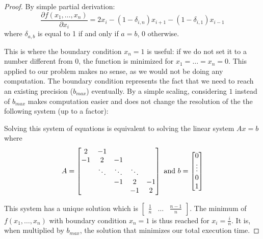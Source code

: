\begin{proof}
    By simple partial derivation: \[ \frac{\partial f(x_1,\dots,x_n)}{\partial
    x_i} = 2x_i - (1-\delta_{i,n})x_{i+1} - (1-\delta_{i,1})x_{i-1} \] where
    $\delta_{a,b} $ is equal to 1 if and only if $a=b$, 0 otherwise.

    This is where the boundary condition $x_n = 1$ is useful: if we do not set it
    to a number different from 0, the function is minimized for
    $x_1=\dots=x_n=0$. This applied to our problem makes no sense, as we
    would not be doing any computation. The boundary condition represents the
    fact that we need to reach an existing precision ($b_{max}$) eventually. By
    a simple scaling, considering $1$ instead of $b_{max}$ makes computation
    easier and does not change the resolution of the the following system (up
    to a factor):


    Solving this system of equations is equivalent to solving the linear system $Ax=b$ where
    \[ A =
    \begin{bmatrix}
    2       & -1 &  &  &  \\
    -1       & 2 & -1 &  &  \\
    & \ddots & \ddots & \ddots & \\
    & & -1 & 2 & -1 \\
           &  &  & -1 & 2
    \end{bmatrix}
    \textup{ and } b = \begin{bmatrix} 0 \\ \vdots \\ 0 \\ 1 \end{bmatrix} \]

    This system has a unique solution which is $\begin{bmatrix} \frac{1}{n} & \dots
    & \frac{n-1}{n} \end{bmatrix}$.  The minimum of $f(x_1,\dots,x_n)$ with
    boundary condition $x_n=1$ is thus reached for $x_i = \frac{i}{n}$.  It
    is, when multiplied by $b_{max}$, the solution that minimizes our total
    execution time.

\end{proof}

